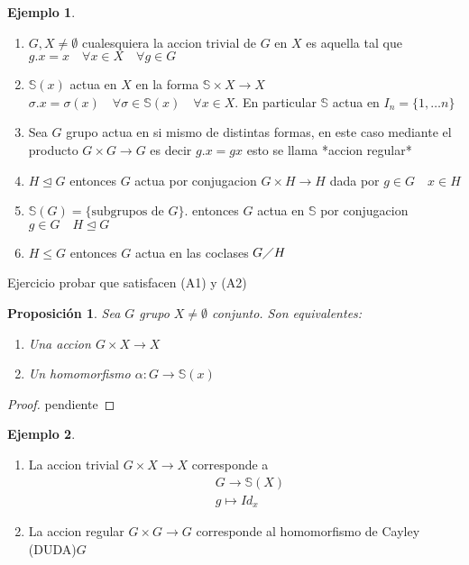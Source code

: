 \documentclass[10pt]{extarticle}
\theoremstyle{break}
\newtheorem{proposition}{Proposición}
\theoremstyle{definition}
\newtheorem{example}{Ejemplo}[section]
\begin{document}
\begin{example}
	\begin{enumerate}
		\item $G,X\neq\emptyset$ cualesquiera la accion trivial de $G$ en $X$ es aquella tal que $g.x=x\quad\forall x\in X\quad\forall g\in G$
	  	\item $\mathbb{S}(x)$ actua en $X$ en la forma $\mathbb{S}\times X\longrightarrow X$ $\sigma.x=\sigma(x)\quad\forall \sigma\in \mathbb{S}(x)\quad\forall x\in X$. En particular $\mathbb{S}$ actua en $I_{n}=\{ 1,\ldots n \}$
		\item Sea $G$ grupo actua en si mismo de distintas formas, en este caso mediante el producto $G\times G \longrightarrow G$ es decir $g.x=gx$ esto se llama *accion regular*
		\item $H\trianglelefteq G$ entonces $G$ actua por conjugacion $G\times H \longrightarrow H$ dada por $g\in G\quad x\in H$
		\item $\mathbb{S}(G)=\{ \text{subgrupos de } G \}$. entonces $G$ actua en $\mathbb{S}$ por conjugacion $g\in G\quad H\trianglelefteq G$
		\item  $H\leq G$ entonces $G$ actua en las coclases $G\diagup H$
	\end{enumerate}
	Ejercicio probar que satisfacen (A1) y (A2)
\end{example}

\begin{proposition}
	Sea $G$ grupo $X\neq\emptyset$ conjunto. Son equivalentes:
	\begin{enumerate}
		\item Una accion $G\times X \longrightarrow X$
		\item Un homomorfismo $\alpha : G\rightarrow \mathbb{S} (x)$
	\end{enumerate}\end{proposition}
\begin{proof}
pendiente
\end{proof}

\begin{example}
	\begin{enumerate}
		\item La accion trivial $G\times X\rightarrow X$ corresponde a
			\begin{align} 
				&G\longrightarrow \mathbb{S} (X)\nonumber\\
				&g\longmapsto Id_{x}\nonumber
			\end{align}
		\item La accion regular $G\times G\longrightarrow G$ corresponde al homomorfismo de Cayley (DUDA)$G$
	\end{enumerate}
\end{example}
\end{document}
